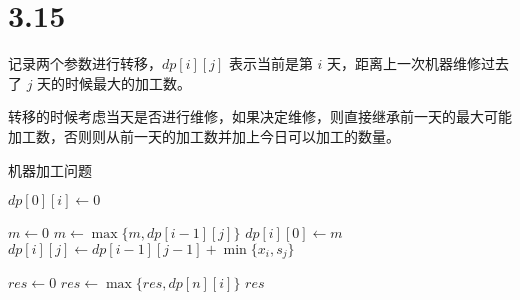 \section*{3.15}

记录两个参数进行转移，$dp[i][j]$ 表示当前是第 $i$ 天，距离上一次机器维修过去了 $j$ 天的时候最大的加工数。

转移的时候考虑当天是否进行维修，如果决定维修，则直接继承前一天的最大可能加工数，否则则从前一天的加工数并加上今日可以加工的数量。

\begin{algorithm}[!htbp]
  \caption{机器加工问题}
  \begin{algorithmic}[1]
      \State $dp[0][i] \gets 0$
    \EndFor

      \State $m \gets 0$
        \State $m \gets \max\{m, dp[i-1][j]\}$
      \EndFor
      \State $dp[i][0] \gets m$
        \State $dp[i][j] \gets dp[i-1][j-1] + \min\{x_i, s_j\}$
      \EndFor
    \EndFor

    \State $res \gets 0$
      \State $res \gets \max\{res, dp[n][i]\}$
    \EndFor
    \State \Return $res$
  \EndFunction
  \end{algorithmic}
\end{algorithm}
